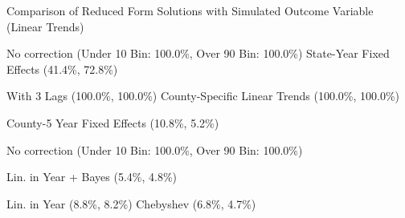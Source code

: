 \caption{Comparison of Reduced Form Solutions with Simulated Outcome Variable (Linear Trends) \label{fig:distributions-existing-solutions}}
\caption*{\color{p1line}{\textbf{\textemdash\textemdash}} No correction (Under 10 Bin: 100.0\%, Over 90 Bin: 100.0\%) \hspace{1cm} \color{p2line}{- - -} State-Year Fixed Effects (41.4\%, 72.8\%)}
\caption*{\color{p3line}{\textbf{- - -}} With 3 Lags (100.0\%, 100.0\%) \hspace{1cm} \color{p4line}{\textbf{- - -}} County-Specific Linear Trends (100.0\%, 100.0\%)}
\caption*{\color{p5line}{\textbf{- - -}} County-5 Year Fixed Effects (10.8\%, 5.2\%)}


\caption*{\color{p1line}{\textbf{\textemdash\textemdash}} No correction (Under 10 Bin: 100.0\%, Over 90 Bin: 100.0\%)}
\caption*{\color{p2line}{\textbf{- - -}} Lin. in Year + Bayes (5.4\%, 4.8\%)}
\caption*{\color{p3line}{\textbf{- - -}} Lin. in Year (8.8\%, 8.2\%) \hspace{1cm} \color{p4line}{\textbf{- - -}} Chebyshev (6.8\%, 4.7\%)}